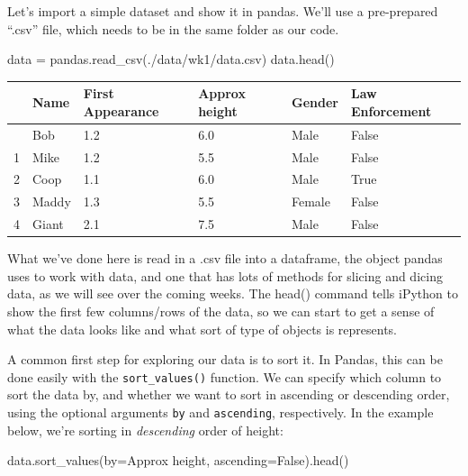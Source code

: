 \documentclass[
  letterpaper,
  DIV=11,
  numbers=noendperiod]{scrreprt}
\newenvironment{Shaded}{\begin{snugshade}}{\end{snugshade}}
\newcommand{\NormalTok}[1]{\textcolor[rgb]{0.00,0.23,0.31}{#1}}
\newcommand{\OperatorTok}[1]{\textcolor[rgb]{0.37,0.37,0.37}{#1}}
\newcommand{\StringTok}[1]{\textcolor[rgb]{0.13,0.47,0.30}{#1}}
\newcommand{\VariableTok}[1]{\textcolor[rgb]{0.07,0.07,0.07}{#1}}
\begin{document}
Let's import a simple dataset and show it in pandas. We'll use a
pre-prepared ``.csv'' file, which needs to be in the same folder as our
code.

\begin{Shaded}
\begin{Highlighting}[]
\NormalTok{data }\OperatorTok{=}\NormalTok{ pandas.read\_csv(}\StringTok{\textquotesingle{}./data/wk1/data.csv\textquotesingle{}}\NormalTok{)}
\NormalTok{data.head()}
\end{Highlighting}
\end{Shaded}

\begin{longtable}[]{@{}llllll@{}}
\toprule\noalign{}
& Name & First Appearance & Approx height & Gender & Law Enforcement \\
\midrule\noalign{}
\endhead
\bottomrule\noalign{}
\endlastfoot
0 & Bob & 1.2 & 6.0 & Male & False \\
1 & Mike & 1.2 & 5.5 & Male & False \\
2 & Coop & 1.1 & 6.0 & Male & True \\
3 & Maddy & 1.3 & 5.5 & Female & False \\
4 & Giant & 2.1 & 7.5 & Male & False \\
\end{longtable}

What we've done here is read in a .csv file into a dataframe, the object
pandas uses to work with data, and one that has lots of methods for
slicing and dicing data, as we will see over the coming weeks. The
head() command tells iPython to show the first few columns/rows of the
data, so we can start to get a sense of what the data looks like and
what sort of type of objects is represents.

A common first step for exploring our data is to sort it. In Pandas,
this can be done easily with the \texttt{sort\_values()} function. We
can specify which column to sort the data by, and whether we want to
sort in ascending or descending order, using the optional arguments
\texttt{by} and \texttt{ascending}, respectively. In the example below,
we're sorting in \emph{descending} order of height:

\begin{Shaded}
\begin{Highlighting}[]
\NormalTok{data.sort\_values(by}\OperatorTok{=}\StringTok{\textquotesingle{}Approx height\textquotesingle{}}\NormalTok{, ascending}\OperatorTok{=}\VariableTok{False}\NormalTok{).head()}
\end{Highlighting}
\end{Shaded}
\end{document}
